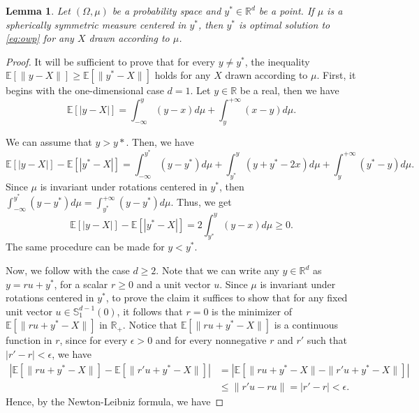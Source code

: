\documentclass[letter,11pt, reqno]{amsart}
\newcommand{\R}{\mathbb{R}}
\newcommand{\E}{\mathbb{E}}
\renewcommand{\SS}{\mathbb{S}}
\renewcommand{\;}{\quad}
\theoremstyle{thmstyleone}%
\newtheorem{lemma}[theorem]{Lemma}%
\theoremstyle{thmstyletwo}%
\theoremstyle{thmstylethree}%
\begin{document}
\begin{lemma}\label{lemma:single-va}
    Let $(\Omega,\mu)$ be a probability space and $y^*\in \R^d$ be a point. If $\mu$ is a spherically symmetric measure centered in $y^*$, then $y^*$ is optimal solution to \ref{eq:owp} for any $X$ drawn according to $\mu$.
\end{lemma}
\begin{proof}
    It will be sufficient to prove that for every $y\neq y^*$, the inequality $\E\left[\|y-X\|\right]\geq \E\left[\|y^*-X\|\right]$ holds for any $X$ drawn according to $\mu$. First, it begins with the one-dimensional case $d=1$. Let $y\in \R$ be a real, then we have
    \begin{equation*}
        \E\left[|y-X|\right]=\int_{-\infty}^y(y-x)d\mu + \int_{y}^{+\infty}(x-y)d\mu.
    \end{equation*}

    We can assume that $y>y*$. Then, we have
    \begin{equation*}
        \E\left[|y-X|\right] - \E\left[|y^*-X|\right] = \int_{-\infty}^{y^*}(y-y^*)d\mu +\int_{y^*}^{y} (y+y^*-2x) d\mu + \int_{y}^{+\infty} (y^*-y) d\mu.
    \end{equation*}
    Since $\mu$ is invariant under rotations centered in $y^*$, then $\int_{-\infty}^{y^*}(y-y^*)d\mu = \int_{y^*}^{+\infty}(y-y^*)d\mu$. Thus, we get
    \begin{equation*}
        \E\left[|y-X|\right] - \E\left[|y^*-X|\right] = 2\int_{y^*}^{y} (y-x) d\mu \geq 0.
    \end{equation*}
    The same procedure can be made for $y<y^*$.

    Now, we follow with the case $d\geq 2$. Note that we can write any $y\in \R^d$ as $y = ru+y^*$, for a scalar $r\geq 0$ and a unit vector $u$. Since $\mu$ is invariant under rotations centered in $y^*$, to prove the claim it suffices to show that for any fixed unit vector $u\in \SS^{d-1}_1(0)$, it follows that $r = 0$ is the minimizer of $\E\left[\|ru+y^*-X\|\right]$ in $\R_+$. Notice that $\E\left[\|ru+y^*-X\|\right]$ is a continuous function in $r$, since for every $\epsilon>0$ and for every nonnegative $r$ and $r'$ such that $|r'-r|<\epsilon$, we have
    \begin{align*}
        \left|\E\left[\|ru+y^*-X\|\right] - \E\left[\|r'u+y^*-X\|\right]\right|&=\left|\E\left[\|ru+y^*-X\|-\|r'u+y^*-X\|\right]\right|\\
        & \leq \|r'u-ru\|=|r'-r|<\epsilon.
    \end{align*}
    Hence, by the Newton-Leibniz formula, we have


\end{proof}
\end{document}
